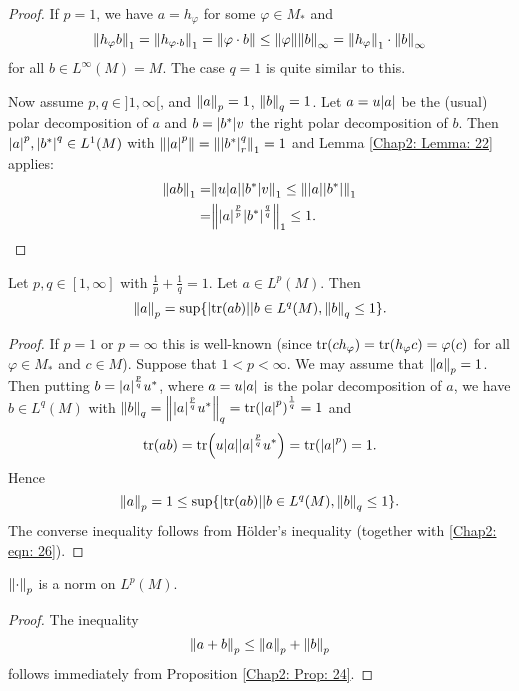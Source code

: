 \begin{proof}
    If $p=1$, we have $a=h_\varphi$ for some $\varphi\in M_*$ and
    \[
        \norm{h_\varphi b}_1=\norm{h_{\varphi\cdot b}}_1=\norm{\varphi\cdot b}\leq \norm{\varphi}\norm{b}_\infty=\norm{h_\varphi}_1\cdot \norm{b}_\infty
    \]
    for all $b\in L^\infty(M)=M$. The case $q=1$ is quite similar to this.\par
    Now assume $p,q\in ]1,\infty[$, and $\norm{a}_p=1$, $\norm{b}_q=1$. Let $a=u\abs{a}$ be the (usual) polar decomposition of $a$ and $b=\abs{b^*}v$ the right polar decomposition of $b$. Then $\abs{a}^p, \abs{b^*}^q\in L^1(M)$ with $\norm{\abs{a}^p}=\norm{\abs{b^*}_r^q}_1=1$ and Lemma \ref{Chap2: Lemma: 22} applies:
    \[
        \begin{split}
            \norm{ab}_1=&\norm{u\abs{a}\abs{b^*}v}_1\leq \norm{\abs{a}\abs{b^*}}_1\\
            =&\norm{\abs{a}^\frac{p}{p}\abs{b^*}^\frac{q}{q}}_1\leq 1.
        \end{split}
    \]
\end{proof}
\begin{proposition}\label{Chap2: Prop: 24}
    Let $p,q\in [1,\infty]$ with $\frac{1}{p}+\frac{1}{q}=1$. Let $a\in L^p(M)$. Then
    \[
        \norm{a}_p=\sup\{\abs{\tr(ab)}|b\in L^q(M),\norm{b}_q\leq 1\}.
    \]
\end{proposition}
\begin{proof}
    If $p=1$ or $p=\infty$ this is well-known (since $\tr(ch_\varphi)=\tr(h_\varphi c)=\varphi(c)$ for all $\varphi\in M_*$ and $c\in M$). Suppose that $1<p<\infty$. We may assume that $\norm{a}_p=1$. Then putting $b=\abs{a}^\frac{p}{q}u^*$, where $a=u\abs{a}$ is the polar decomposition of $a$, we have $b\in L^q(M)$ with $\norm{b}_q=\norm{\abs{a}^\frac{p}{q}u^*}_q=\tr(\abs{a}^p)^\frac{1}{q}=1$ and
    \[
        \tr(ab)=\tr(u\abs{a}\abs{a}^\frac{p}{q}u^*)=\tr(\abs{a}^p)=1.
    \]
    Hence
    \[
        \norm{a}_p=1\leq \sup\{\abs{\tr(ab)}|b\in L^q(M),\norm{b}_q\leq 1\}.
    \]
    The converse inequality follows from H\"older's inequality (together with \eqref{Chap2: eqn: 26}).
\end{proof}
\begin{corollary}
    $\norm{\cdot}_p$ is a norm on $L^p(M)$.
\end{corollary}
\begin{proof}
    The inequality
    \[
        \norm{a+b}_p\leq \norm{a}_p+\norm{b}_p
    \]
    follows immediately from Proposition \ref{Chap2: Prop: 24}.
\end{proof}
